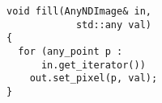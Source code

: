 \documentclass[varwidth=4cm,border={0.1cm 0.1cm 0.1cm 0.1cm}]{standalone}
\begin{document}
\begin{verbatim}
void fill(AnyNDImage& in,
            std::any val)
{
  for (any_point p :
      in.get_iterator())
    out.set_pixel(p, val);
}
\end{verbatim}
\end{document}
